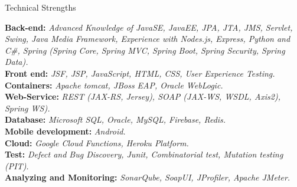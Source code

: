 \documentclass{resume} %
\begin{document}
\begin{rSection}{Technical Strengths}

{\bf Back-end:}  {\em Advanced Knowledge of JavaSE, JavaEE, JPA, JTA, JMS, Servlet, Swing, Java Media Framework, Experience with Nodes.js, Express, Python and C\#, Spring (Spring Core, Spring MVC, Spring Boot, Spring Security, Spring Data).} \\
{\bf Front end:}  {\em   JSF, JSP, JavaScript, HTML, CSS, User Experience Testing.}\\
{\bf Containers:}  {\em  Apache tomcat, JBoss EAP, Oracle WebLogic.}\\
{\bf Web-Service:}  {\em  REST (JAX-RS, Jersey), SOAP (JAX-WS, WSDL, Axis2), Spring WS).}\\
{\bf Database:}  {\em Microsoft SQL, Oracle, MySQL, Firebase, Redis.}\\
{\bf Mobile development:}  {\em Android.}\\
{\bf Cloud:}  {\em Google Cloud Functions, Heroku Platform.}\\
{\bf Test:}  {\em Defect and Bug Discovery, Junit, Combinatorial test, Mutation testing (PIT). }\\
{\bf Analyzing and Monitoring:}  {\em SonarQube, SoapUI, JProfiler, Apache JMeter.}\\

\end{rSection}
\end{document}
